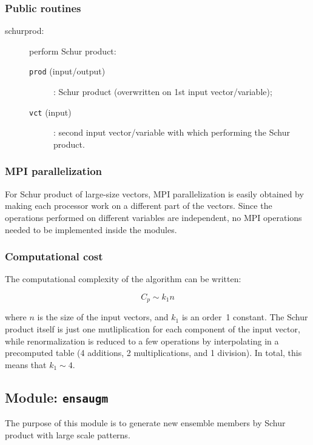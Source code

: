 \documentclass[11pt]{article}
\begin{document}
\subsubsection*{Public routines}

\begin{description}
\item[schurprod:] perform Schur product:
  \begin{description}
  \item[{\tt prod} (input/output)]: Schur product (overwritten on 1st input vector/variable);
  \item[{\tt vct} (input)]: second input vector/variable with which performing the Schur product.
  \end{description}
\end{description}

\subsubsection*{MPI parallelization}

For Schur product of large-size vectors,
MPI parallelization is easily obtained by making each processor
work on a different part of the vectors.
Since the operations performed on different variables are independent,
no MPI operations needed to be implemented inside the modules.

\subsubsection*{Computational cost}

The computational complexity of the algorithm can be written:

\begin{equation}
C_p \sim k_1 n
\end{equation}

\noindent
where $n$ is the size of the input vectors, and $k_1$ is an order~1 constant.
The Schur product itself is just one mutliplication for each component of the input vector,
while renormalization is reduced to a few operations by interpolating in a precomputed table
(4 additions, 2 multiplications, and 1 division).
In total, this means that $k_1 \sim 4$.

\subsection{Module: {\tt\bf ensaugm}}

The purpose of this module is to generate new ensemble members
by Schur product with large scale patterns.
\end{document}

